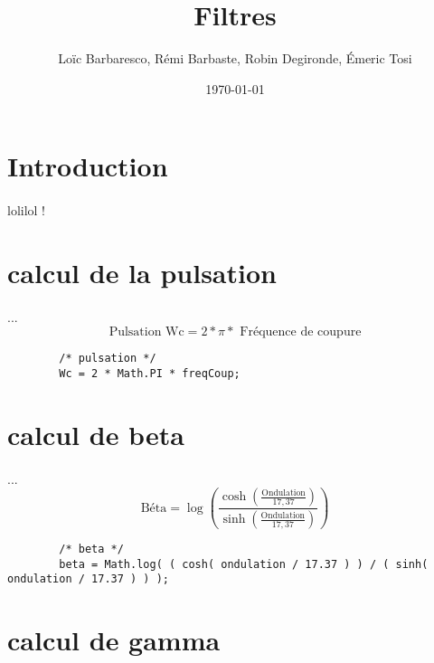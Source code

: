 \documentclass[a4paper,11pt]{article}
\title{Filtres}
\author{Loïc Barbaresco, Rémi Barbaste, Robin Degironde, Émeric Tosi}
\date{\today}
\begin{document}
    \maketitle{}

    \setcounter{tocdepth}{1} %
    \renewcommand{\contentsname}{Sommaire} %
    \tableofcontents{} %
    \clearpage



\section{Introduction}
        \paragraph{}
lolilol !

\section{calcul de la pulsation}
    \paragraph{}
    ...\[ \mbox{Pulsation Wc} = 2 * \pi * \mbox{ Fréquence de coupure}\]
    \begin{lstlisting}
        /* pulsation */
        Wc = 2 * Math.PI * freqCoup;
    \end{lstlisting}

\section{calcul de beta}
    \paragraph{}
    ...\[ \mbox{Béta} = \log( \frac{ \cosh( \frac{ \mbox{Ondulation} }{17,37} ) } { \sinh( \frac{ \mbox{Ondulation} }{17,37} ) } )\]
    \begin{lstlisting}
        /* beta */
        beta = Math.log( ( cosh( ondulation / 17.37 ) ) / ( sinh( ondulation / 17.37 ) ) );
    \end{lstlisting}

\section{calcul de gamma}
\end{document}

